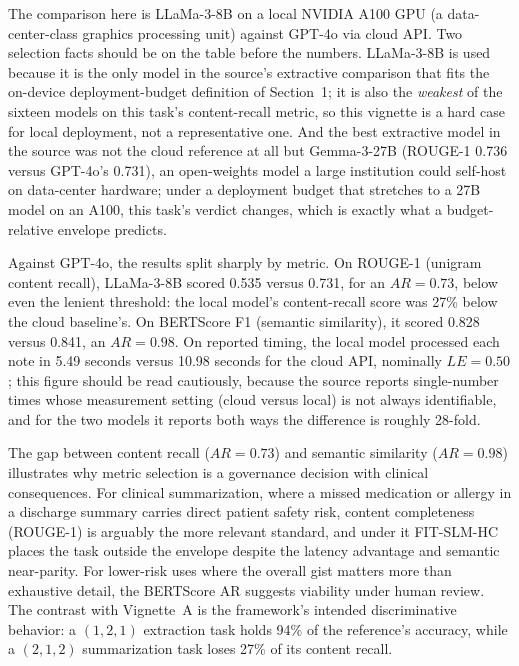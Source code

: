 \documentclass[11pt]{article}
\begin{document}
The comparison here is LLaMa-3-8B on a local NVIDIA A100 GPU (a data-center-class graphics processing unit) against GPT-4o via cloud API. Two selection facts should be on the table before the numbers. LLaMa-3-8B is used because it is the only model in the source's extractive comparison that fits the on-device deployment-budget definition of Section~1; it is also the \emph{weakest} of the sixteen models on this task's content-recall metric, so this vignette is a hard case for local deployment, not a representative one. And the best extractive model in the source was not the cloud reference at all but Gemma-3-27B (ROUGE-1 0.736 versus GPT-4o's 0.731), an open-weights model a large institution could self-host on data-center hardware; under a deployment budget that stretches to a 27B model on an A100, this task's verdict changes, which is exactly what a budget-relative envelope predicts.

Against GPT-4o, the results split sharply by metric. On ROUGE-1 (unigram content recall), LLaMa-3-8B scored 0.535 versus 0.731, for an $AR = 0.73$, below even the lenient threshold: the local model's content-recall score was 27\% below the cloud baseline's. On BERTScore F1 (semantic similarity), it scored 0.828 versus 0.841, an $AR = 0.98$. On reported timing, the local model processed each note in 5.49 seconds versus 10.98 seconds for the cloud API, nominally $LE = 0.50$; this figure should be read cautiously, because the source reports single-number times whose measurement setting (cloud versus local) is not always identifiable, and for the two models it reports both ways the difference is roughly 28-fold.

The gap between content recall ($AR = 0.73$) and semantic similarity ($AR = 0.98$) illustrates why metric selection is a governance decision with clinical consequences. For clinical summarization, where a missed medication or allergy in a discharge summary carries direct patient safety risk, content completeness (ROUGE-1) is arguably the more relevant standard, and under it FIT-SLM-HC places the task outside the envelope despite the latency advantage and semantic near-parity. For lower-risk uses where the overall gist matters more than exhaustive detail, the BERTScore AR suggests viability under human review. The contrast with Vignette~A is the framework's intended discriminative behavior: a $(1,2,1)$ extraction task holds 94\% of the reference's accuracy, while a $(2,1,2)$ summarization task loses 27\% of its content recall.

\end{document}
